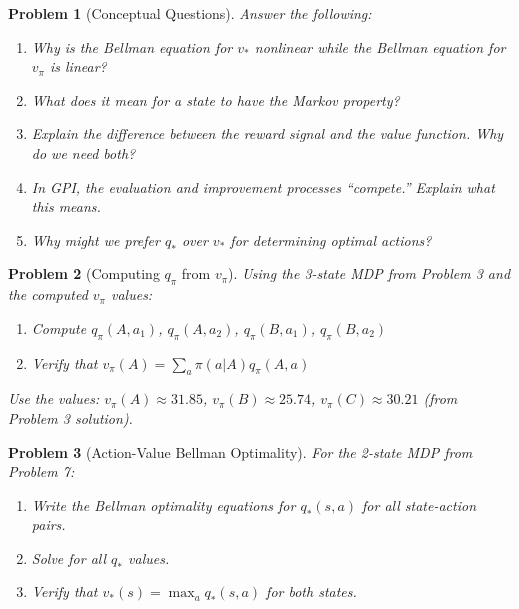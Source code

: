 \documentclass[11pt]{article}
\newtheorem{problem}{Problem}
\theoremstyle{definition}
\begin{document}
\vfill
\newpage

\begin{problem}[Conceptual Questions]
Answer the following:
\begin{enumerate}[label=(\alph*)]
    \item Why is the Bellman equation for $v_*$ nonlinear while the Bellman equation for $v_\pi$ is linear?
    \item What does it mean for a state to have the Markov property?
    \item Explain the difference between the reward signal and the value function. Why do we need both?
    \item In GPI, the evaluation and improvement processes ``compete.'' Explain what this means.
    \item Why might we prefer $q_*$ over $v_*$ for determining optimal actions?
\end{enumerate}
\end{problem}

\vfill
\newpage

\begin{problem}[Computing $q_\pi$ from $v_\pi$]
Using the 3-state MDP from Problem 3 and the computed $v_\pi$ values:
\begin{enumerate}[label=(\alph*)]
    \item Compute $q_\pi(A, a_1)$, $q_\pi(A, a_2)$, $q_\pi(B, a_1)$, $q_\pi(B, a_2)$
    \item Verify that $v_\pi(A) = \sum_a \pi(a|A) q_\pi(A, a)$
\end{enumerate}

Use the values: $v_\pi(A) \approx 31.85$, $v_\pi(B) \approx 25.74$, $v_\pi(C) \approx 30.21$ (from Problem 3 solution).
\end{problem}

\vfill
\newpage

\begin{problem}[Action-Value Bellman Optimality]
For the 2-state MDP from Problem 7:
\begin{enumerate}[label=(\alph*)]
    \item Write the Bellman optimality equations for $q_*(s,a)$ for all state-action pairs.
    \item Solve for all $q_*$ values.
    \item Verify that $v_*(s) = \max_a q_*(s,a)$ for both states.
\end{enumerate}
\end{problem}

\vfill
\newpage
\end{document}
